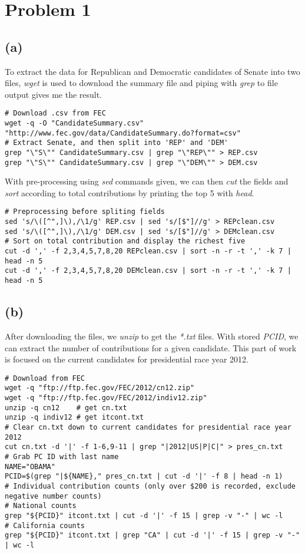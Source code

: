 \documentclass{article}
\begin{document}
\section*{Problem 1}
\subsection*{(a)}

To extract the data for Republican and Democratic candidates of Senate into two files,
\textit{wget} is used to download the summary file and piping with \textit{grep} to file output gives me the result.

\begin{lstlisting}
# Download .csv from FEC
wget -q -O "CandidateSummary.csv" "http://www.fec.gov/data/CandidateSummary.do?format=csv"
# Extract Senate, and then split into 'REP' and 'DEM'
grep "\"S\"" CandidateSummary.csv | grep "\"REP\"" > REP.csv
grep "\"S\"" CandidateSummary.csv | grep "\"DEM\"" > DEM.csv
\end{lstlisting}

With pre-processing using \textit{sed} commands given, we can then \textit{cut} the fields and
\textit{sort} according to total contributions by printing the top 5 with \textit{head}.

\begin{lstlisting}
# Preprocessing before spliting fields
sed 's/\([^",]\),/\1/g' REP.csv | sed 's/[$"]//g' > REPclean.csv
sed 's/\([^",]\),/\1/g' DEM.csv | sed 's/[$"]//g' > DEMclean.csv
# Sort on total contribution and display the richest five
cut -d ',' -f 2,3,4,5,7,8,20 REPclean.csv | sort -n -r -t ',' -k 7 | head -n 5
cut -d ',' -f 2,3,4,5,7,8,20 DEMclean.csv | sort -n -r -t ',' -k 7 | head -n 5
\end{lstlisting}

\subsection*{(b)}

After downloading the files, we \textit{unzip} to get the \textit{*.txt} files. With stored \textit{PCID},
we can extract the number of contributions for a given candidate. This part of work is focused on the current
candidates for presidential race year 2012.

\begin{lstlisting}
# Download from FEC
wget -q "ftp://ftp.fec.gov/FEC/2012/cn12.zip"
wget -q "ftp://ftp.fec.gov/FEC/2012/indiv12.zip"
unzip -q cn12    # get cn.txt
unzip -q indiv12 # get itcont.txt
# Clear cn.txt down to current candidates for presidential race year 2012
cut cn.txt -d '|' -f 1-6,9-11 | grep "|2012|US|P|C|" > pres_cn.txt
# Grab PC ID with last name
NAME="OBAMA"
PCID=$(grep "|${NAME}," pres_cn.txt | cut -d '|' -f 8 | head -n 1)
# Individual contribution counts (only over $200 is recorded, exclude negative number counts)
# National counts
grep "${PCID}" itcont.txt | cut -d '|' -f 15 | grep -v "-" | wc -l
# California counts
grep "${PCID}" itcont.txt | grep "CA" | cut -d '|' -f 15 | grep -v "-" | wc -l
\end{lstlisting}
\end{document}
